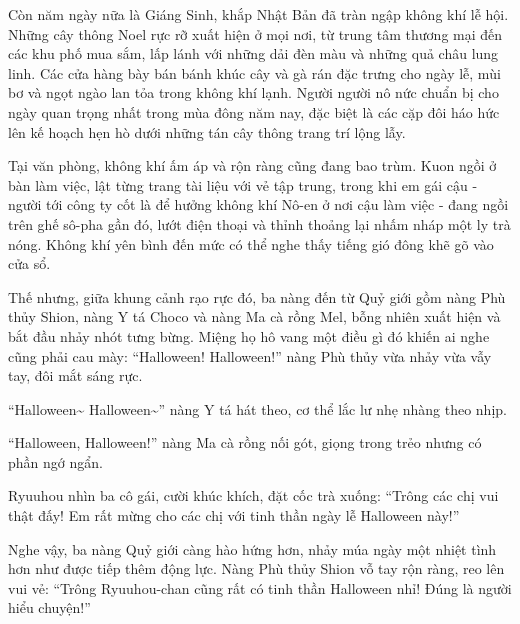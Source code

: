 \documentclass[../main.tex]{subfiles}
\begin{document}

Còn năm ngày nữa là Giáng Sinh, khắp Nhật Bản đã tràn ngập không khí lễ hội. Những cây thông Noel rực rỡ xuất hiện ở mọi nơi, từ trung tâm thương mại đến các khu phố mua sắm, lấp lánh với những dải đèn màu và những quả châu lung linh. Các cửa hàng bày bán bánh khúc cây và gà rán đặc trưng cho ngày lễ, mùi bơ và ngọt ngào lan tỏa trong không khí lạnh. Người người nô nức chuẩn bị cho ngày quan trọng nhất trong mùa đông năm nay, đặc biệt là các cặp đôi háo hức lên kế hoạch hẹn hò dưới những tán cây thông trang trí lộng lẫy.

Tại văn phòng, không khí ấm áp và rộn ràng cũng đang bao trùm. Kuon ngồi ở bàn làm việc, lật từng trang tài liệu với vẻ tập trung, trong khi em gái cậu - người tới công ty cốt là để hưởng không khí Nô-en ở nơi cậu làm việc - đang ngồi trên ghế sô-pha gần đó, lướt điện thoại và thỉnh thoảng lại nhấm nháp một ly trà nóng. Không khí yên bình đến mức có thể nghe thấy tiếng gió đông khẽ gõ vào cửa sổ.

Thế nhưng, giữa khung cảnh rạo rực đó, ba nàng đến từ Quỷ giới gồm nàng Phù thủy Shion, nàng Y tá Choco và nàng Ma cà rồng Mel, bỗng nhiên xuất hiện và bắt đầu nhảy nhót tưng bừng. Miệng họ hô vang một điều gì đó khiến ai nghe cũng phải cau mày: ``Halloween! Halloween!'' nàng Phù thủy vừa nhảy vừa vẫy tay, đôi mắt sáng rực.

``Halloween\~{} Halloween\~{}'' nàng Y tá hát theo, cơ thể lắc lư nhẹ nhàng theo nhịp.

``Halloween, Halloween!'' nàng Ma cà rồng nối gót, giọng trong trẻo nhưng có phần ngớ ngẩn.


Ryuuhou nhìn ba cô gái, cười khúc khích, đặt cốc trà xuống: ``Trông các chị vui thật đấy! Em rất mừng cho các chị với tinh thần ngày lễ Halloween này!''

Nghe vậy, ba nàng Quỷ giới càng hào hứng hơn, nhảy múa ngày một nhiệt tình hơn như được tiếp thêm động lực. Nàng Phù thủy Shion vỗ tay rộn ràng, reo lên vui vẻ: ``Trông Ryuuhou-chan cũng rất có tinh thần Halloween nhỉ! Đúng là người hiểu chuyện!''
\end{document}

